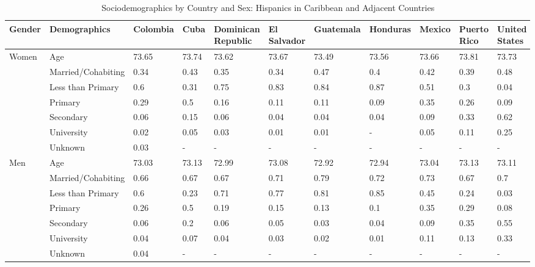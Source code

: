 \documentclass[
]{article}
\begin{document}
\begin{landscape}

\begin{table}[ht]
\centering
\caption{Sociodemographics by Country and Sex: Hispanics in Caribbean and Adjacent Countries}
\begingroup\small
\begin{tabular}{l|l|lllllllll}
  \hline
Gender & Demographics & Colombia & Cuba & Dominican Republic & El Salvador & Guatemala & Honduras & Mexico & Puerto Rico & United States \\ 
  \hline
Women & Age & 73.65 & 73.74 & 73.62 & 73.67 & 73.49 & 73.56 & 73.66 & 73.81 & 73.73 \\ 
   & Married/Cohabiting & 0.34 & 0.43 & 0.35 & 0.34 & 0.47 & 0.4 & 0.42 & 0.39 & 0.48 \\ 
   & Less than Primary & 0.6 & 0.31 & 0.75 & 0.83 & 0.84 & 0.87 & 0.51 & 0.3 & 0.04 \\ 
   & Primary & 0.29 & 0.5 & 0.16 & 0.11 & 0.11 & 0.09 & 0.35 & 0.26 & 0.09 \\ 
   & Secondary & 0.06 & 0.15 & 0.06 & 0.04 & 0.04 & 0.04 & 0.09 & 0.33 & 0.62 \\ 
   & University & 0.02 & 0.05 & 0.03 & 0.01 & 0.01 & - & 0.05 & 0.11 & 0.25 \\ 
   & Unknown & 0.03 & - & - & - & - & - & - & - & - \\ 
  Men & Age & 73.03 & 73.13 & 72.99 & 73.08 & 72.92 & 72.94 & 73.04 & 73.13 & 73.11 \\ 
   & Married/Cohabiting & 0.66 & 0.67 & 0.67 & 0.71 & 0.79 & 0.72 & 0.73 & 0.67 & 0.7 \\ 
   & Less than Primary & 0.6 & 0.23 & 0.71 & 0.77 & 0.81 & 0.85 & 0.45 & 0.24 & 0.03 \\ 
   & Primary & 0.26 & 0.5 & 0.19 & 0.15 & 0.13 & 0.1 & 0.35 & 0.29 & 0.08 \\ 
   & Secondary & 0.06 & 0.2 & 0.06 & 0.05 & 0.03 & 0.04 & 0.09 & 0.35 & 0.55 \\ 
   & University & 0.04 & 0.07 & 0.04 & 0.03 & 0.02 & 0.01 & 0.11 & 0.13 & 0.33 \\ 
   & Unknown & 0.04 & - & - & - & - & - & - & - & - \\ 
\hline
\end{tabular}
\endgroup
\end{table}

\newpage


\end{landscape}
\end{document}
